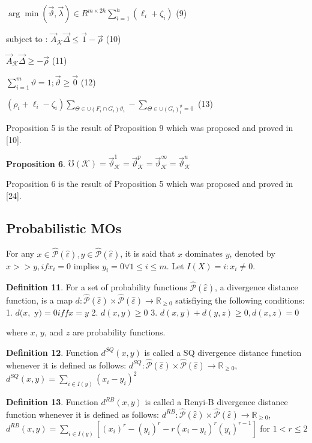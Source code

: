 \documentclass[]{iosart2c}
\begin{document}
  $\arg \min(\vec{\vartheta},\vec{\lambda})\in R^{m \times 2h}\sum^h_{i=1}(\ell_i + \zeta_i)$ (9)

  subject to : $\vec{A}_\mathcal{K} \vec{\Delta} \le \vec{1} - \vec{\rho}$ (10)

  $\vec{A}_\mathcal{K} \vec\Delta\geq -\vec{\rho}$ (11)

  $\sum^m_{i=1} \vartheta = 1;\vec{\vartheta}\geq\vec{0}$ (12)

  $(\rho_i + \ell_i - \zeta_i)\sum_{\Theta \in \cup(F_i \cap G_i)\vartheta_i} - \sum_{\Theta\in\cup(G_i)^\vartheta_i=0}$ (13)

  Proposition 5 is the result of Proposition 9 which was proposed and proved in [10].

  \textbf{Proposition 6}. $\mho(\mathcal{K}) = \vec{\vartheta}^1_\mathcal{K} = \vec{\vartheta}^p_\mathcal{K} = \vec{\vartheta}^\infty_\mathcal{K} = \vec{\vartheta}^u_\mathcal{K}$

  Proposition 6 is the result of Proposition 5 which was proposed and proved in [24].

  \subsection{Probabilistic MOs}

  For any $x \in \hat{\mathcal{P}}(\hat{\varepsilon}), y \in \hat{\mathcal{P}}(\hat{\varepsilon})$, it is said that $x$ dominates $y$, denoted by $x >> y, if x_i = 0$ implies $y_i = 0 \forall 1 \le i \le m$. Let $I(X) = {i : x_i \neq 0}$.

  \textbf{Definition 11}. For a set of probability functions $\hat{\mathcal{P}} (\hat{\varepsilon})$, a divergence distance function, is a map $d : \hat{\mathcal{P}} (\hat{\varepsilon}) \times \hat{\mathcal{P}} (\hat{\varepsilon}) \to \mathbb{R}_{\geq0}$ satisfiying the following conditions:
  1. $d(x,$ y$) = 0 iff x = y$
  2. $d(x, y) \geq 0$
  3. $d(x, y) + d(y, z)\ge0, d(x, z) = 0$

  where $x$, $y$, and $z$ are probability functions.

  \textbf{Definition 12}. Function $d^{SQ}(x, y)$ is called a SQ divergence distance function whenever it is defined as follows: $d^{SQ} : \hat{\mathcal{P}} (\hat{\varepsilon}) \times \hat{\mathcal{P}} (\hat{\varepsilon}) \to \mathbb{R}_{\geq0}$, $d^{SQ}(x, y) = \sum_{i \in I(y)} (x_i - y_i)^2$

  \textbf{Definition 13}. Function $d^{RB}(x, y)$ is called a Renyi-B divergence distance function whenever it is defined as follows: $d^{RB} : \hat{\mathcal{P}}(\hat{\varepsilon}) \times \hat{\mathcal{P}} (\hat{\varepsilon}) \to \mathbb{R}_{\ge 0}$, $d^{RB}(x, y)=\sum_{i\in I(y)}[(x_i)^r - (y_i)^r - r(x_i - y_i)^r(y_i)^{r-1}]$ for $1 < r \le 2$
\end{document}
